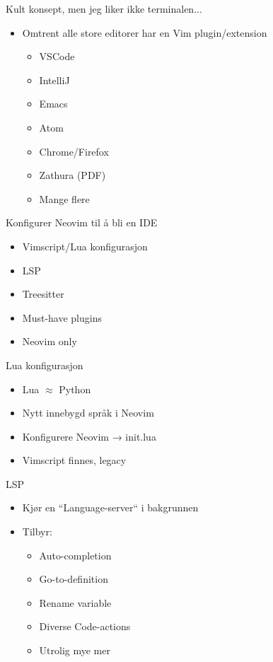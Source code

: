 \documentclass{beamer}
\begin{document}
\begin{frame}{Kult konsept, men jeg liker ikke terminalen...}
	\begin{itemize}
		\item Omtrent alle store editorer har en Vim plugin/extension
		      \begin{itemize}
			      \item VSCode
			      \item IntelliJ
			      \item Emacs
			      \item Atom
			      \item Chrome/Firefox
			      \item Zathura (PDF)
			      \item Mange flere
		      \end{itemize}
	\end{itemize}
\end{frame}

\begin{frame}{Konfigurer Neovim til å bli en IDE}
	\begin{itemize}
		\item Vimscript/Lua konfigurasjon
		\item LSP
		\item Treesitter
		\item Must-have plugins
        \item Neovim only
	\end{itemize}
\end{frame}

\begin{frame}{Lua konfigurasjon}
	\begin{itemize}
		\item Lua $\approx$ Python
		\item Nytt innebygd språk i Neovim
		\item Konfigurere Neovim → init.lua
		\item Vimscript finnes, legacy
	\end{itemize}
\end{frame}


\begin{frame}{LSP}
	\begin{itemize}
		\item Kjør en ``Language-server`` i bakgrunnen
		\item Tilbyr:
		      \begin{itemize}
			      \item Auto-completion
			      \item Go-to-definition
			      \item Rename variable
			      \item Diverse Code-actions
			      \item Utrolig mye mer
		      \end{itemize}
	\end{itemize}
\end{frame}
\end{document}
